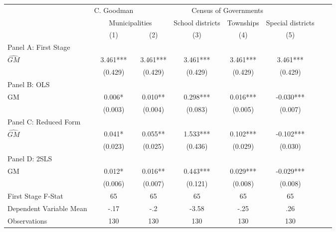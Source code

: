  \begin{tabular}{l*{7}{c}} \toprule
&\multicolumn{1}{c}{C. Goodman}&\multicolumn{4}{c}{Census of Governments}\\\cmidrule(lr){2-2}\cmidrule(lr){3-6}
&\multicolumn{2}{c}{Municipalities}&\multicolumn{1}{c}{School districts}&\multicolumn{1}{c}{Townships}&\multicolumn{1}{c}{Special districts}\\\cmidrule(lr){2-3}\cmidrule(lr){4-6}
&\multicolumn{1}{c}{(1)}&\multicolumn{1}{c}{(2)}&\multicolumn{1}{c}{(3)}&\multicolumn{1}{c}{(4)}&\multicolumn{1}{c}{(5)}\\
\cmidrule(lr){1-6}
\multicolumn{5}{l}{Panel A: First Stage}\\
\cmidrule(lr){1-6}
$\widehat{GM}$  &    3.461***&    3.461***&    3.461***&    3.461***&    3.461***\\
                &  (0.429)   &  (0.429)   &  (0.429)   &  (0.429)   &  (0.429)   \\
\cmidrule(lr){1-6}
\multicolumn{5}{l}{Panel B: OLS}\\
\cmidrule(lr){1-6}
GM              &    0.006*  &    0.010** &    0.298***&    0.016***&   -0.030***\\
                &  (0.003)   &  (0.004)   &  (0.083)   &  (0.005)   &  (0.007)   \\
\cmidrule(lr){1-6}
\multicolumn{5}{l}{Panel C: Reduced Form}\\
\cmidrule(lr){1-6}
$\widehat{GM}$  &    0.041*  &    0.055** &    1.533***&    0.102***&   -0.102***\\
                &  (0.023)   &  (0.025)   &  (0.436)   &  (0.029)   &  (0.030)   \\
\cmidrule(lr){1-6}
\multicolumn{5}{l}{Panel D: 2SLS}\\
\cmidrule(lr){1-6}
GM              &    0.012*  &    0.016** &    0.443***&    0.029***&   -0.029***\\
                &  (0.006)   &  (0.007)   &  (0.121)   &  (0.008)   &  (0.008)   \\
\midrule
First Stage F-Stat&       65   &       65   &       65   &       65   &       65   \\
Dependent Variable Mean&     -.17   &      -.2   &    -3.58   &     -.25   &      .26   \\
Observations    &      130   &      130   &      130   &      130   &      130   \\
 \bottomrule \end{tabular}
